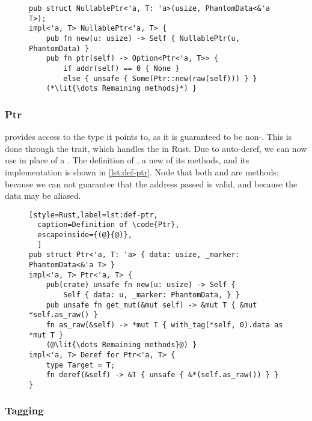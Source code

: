 \begin{figure}[ht]
  \begin{lstlisting}[style=Rust,label=lst:def-nullableptr,
  caption=Definition of \code{NullablePtr}]
pub struct NullablePtr<'a, T: 'a>(usize, PhantomData<&'a T>);
impl<'a, T> NullablePtr<'a, T> {
    pub fn new(u: usize) -> Self { NullablePtr(u, PhantomData) }
    pub fn ptr(self) -> Option<Ptr<'a, T>> {
        if addr(self) == 0 { None }
        else { unsafe { Some(Ptr::new(raw(self))) } }
    (*\lit{\dots Remaining methods}*) }
\end{lstlisting}
\end{figure}


\subsubsection{Ptr}

 provides access to the type it points to, as it is guaranteed to be non-.
This is done through the  trait, which handles the \code{*} in Rust. Due to auto-deref,
we can now use  in place of a . The definition of , a new of its
methods, and its  implementation is shown in \cref{lst:def-ptr}. Node that both
 and  are  methods;  because we can not guarantee
that the address passed is valid, and  because the data may be aliased.

\begin{figure}[ht]
  \begin{lstlisting}[style=Rust,label=lst:def-ptr,
  caption=Definition of \code{Ptr},
  escapeinside={(@}{@)},
  ]
pub struct Ptr<'a, T: 'a> { data: usize, _marker: PhantomData<&'a T> }
impl<'a, T> Ptr<'a, T> {
    pub(crate) unsafe fn new(u: usize) -> Self {
        Self { data: u, _marker: PhantomData, } }
    pub unsafe fn get_mut(&mut self) -> &mut T { &mut *self.as_raw() }
    fn as_raw(&self) -> *mut T { with_tag(*self, 0).data as *mut T }
    (@\lit{\dots Remaining methods}@) }
impl<'a, T> Deref for Ptr<'a, T> {
    type Target = T;
    fn deref(&self) -> &T { unsafe { &*(self.as_raw()) } } }
\end{lstlisting}
\end{figure}


\subsubsection{Tagging}

